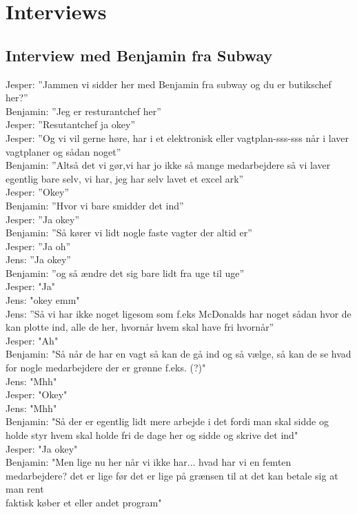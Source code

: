\chapter{Interviews}\label{interviews}
\section{Interview med Benjamin fra Subway}\label{app:subway}
Jesper: ”Jammen vi sidder her med Benjamin fra subway og du er butikschef her?”\\
Benjamin: ”Jeg er resturantchef her”\\
Jesper: ”Resutantchef ja okey”\\
Jesper: ”Og vi vil gerne høre, har i et elektronisk eller vagtplan-sss-sss når i laver vagtplaner og sådan noget”\\
Benjamin: ”Altså det vi gør,vi har jo ikke så mange medarbejdere så vi laver egentlig bare selv, vi har, jeg har selv lavet et excel ark”\\
Jesper: ”Okey”\\
Benjamin: ”Hvor vi bare smidder det ind”\\
Jesper: ”Ja okey”\\
Benjamin: ”Så kører vi lidt nogle faste vagter der altid er”\\
Jesper: ”Ja oh”\\
Jens: ”Ja okey”\\
Benjamin: ”og så ændre det sig bare lidt fra uge til uge”\\
Jesper: "Ja"\\
Jens: "okey emm"\\
Jens: ”Så vi har ikke noget ligesom som f.eks McDonalds har noget sådan hvor de kan plotte ind, alle de her, hvornår hvem skal have fri hvornår”\\
Jesper: "Ah"\\
Benjamin: "Så når de har en vagt så kan de gå ind og så vælge, så kan de se hvad for nogle medarbejdere der er grønne f.eks. (?)"\\
Jens: "Mhh"\\
Jesper: "Okey"\\
Jens: "Mhh"\\
Benjamin: "Så der er egentlig lidt mere arbejde i det fordi man skal sidde og holde styr hvem skal holde fri de dage her og sidde og skrive det ind"\\
Jesper: "Ja okey"\\
Benjamin: "Men lige nu her når vi ikke har... hvad har vi en femten medarbejdere? det er lige før det er lige på grænsen til at det kan betale sig at man rent\\ faktisk køber et eller andet program" \\
